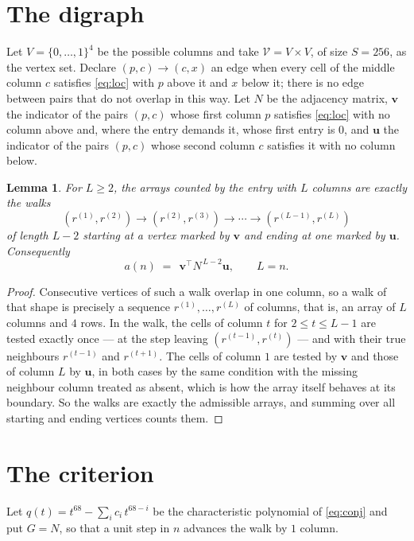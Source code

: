 \documentclass[11pt,a4paper]{article}
\theoremstyle{plain}
\newtheorem{lemma}[theorem]{Lemma}
\theoremstyle{definition}
\begin{document}
\section{The digraph}

Let $V=\{0,\dots,1\}^{4}$ be the possible columns and take
$\mathcal V=V\times V$, of size $S=256$, as the vertex set. Declare $(p,c)\to(c,x)$ an edge
when every cell of the middle column $c$ satisfies \eqref{eq:loc} with $p$ above it and $x$
below it; there is no edge between pairs that do not overlap in this way. Let $N$ be the
adjacency matrix, $\mathbf{v}$ the indicator of the pairs $(p,c)$ whose first column $p$
satisfies \eqref{eq:loc} with no column above and, where the entry demands it, whose first entry is $0$, and $\mathbf{u}$ the indicator of
the pairs $(p,c)$ whose second column $c$ satisfies it with no column below.

\begin{lemma}\label{lem:walk}
For $L\ge2$, the arrays counted by the entry with $L$ columns are exactly the walks
\[
(r^{(1)},r^{(2)})\to(r^{(2)},r^{(3)})\to\cdots\to(r^{(L-1)},r^{(L)})
\]
of length $L-2$ starting at a vertex marked by $\mathbf{v}$ and ending at one marked by
$\mathbf{u}$. Consequently
\[
a(n)\;=\;\,\mathbf{v}^{\!\top}N^{\,L-2}\mathbf{u},\qquad L=n .
\]
\end{lemma}

\begin{proof}
Consecutive vertices of such a walk overlap in one column, so a walk of that shape is
precisely a sequence $r^{(1)},\dots,r^{(L)}$ of columns, that is, an array of $L$ columns
and $4$ rows. In the walk, the cells of column $t$ for $2\le t\le L-1$ are tested
exactly once --- at the step leaving $(r^{(t-1)},r^{(t)})$ --- and with their true
neighbours $r^{(t-1)}$ and $r^{(t+1)}$. The cells of column $1$ are tested by
$\mathbf{v}$ and those of column $L$ by $\mathbf{u}$, in both cases by the same condition
with the missing neighbour column treated as absent, which is how the array itself behaves at
its boundary. So the walks are exactly the admissible arrays, and summing over all starting
and ending vertices counts them.
\end{proof}

\section{The criterion}

Let $q(t)=t^{68}-\sum_i c_i\,t^{68-i}$ be the characteristic polynomial of
\eqref{eq:conj} and put $G=N$, so that a unit step in $n$ advances the walk by
$1$ column.
\end{document}

